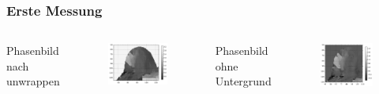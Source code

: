 \documentclass{beamer}
\begin{document}

    \begin{frame}
        \frametitle{Erste Messung}
        \begin{columns}
            Phasenbild nach unwrappen
            \begin{figure}
                \centering
                    \includegraphics[width=.9\linewidth]{../Abbildungen/standart_mask.pdf}
                \end{figure}
                Phasenbild ohne Untergrund
                \begin{figure}
                    \centering
                    \includegraphics[width=.9\linewidth]{../Abbildungen/diff_standart_mask.pdf}
                \end{figure}
            \end{columns}
	\end{frame}
\end{document}
